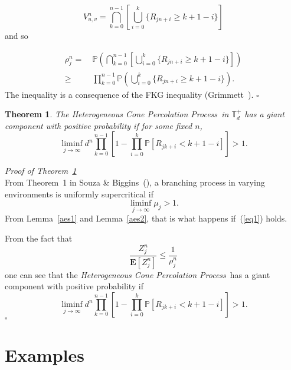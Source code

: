 \documentclass[12pt,reqno,oneside]{amsart}
\theoremstyle{plain}
\newtheorem{teo}{Theorem}[section]
\theoremstyle{definition}
\numberwithin{equation}{section}
\begin{document}
\begin{displaymath}
V^n_{u,v} = \bigcap_{k=0}^{n-1}\displaystyle
\left[\bigcup_{i=0}^{k}\{ R_{jn+i} \geq k+1-i \}\right]
\end{displaymath}
\noindent
and so

\begin{align*}
\rho_{j}^n = & \ {{\mathbb P}}\displaystyle \left (
\bigcap_{k=0}^{n-1}\displaystyle \left[\bigcup_{i=0}^{k}\{
R_{jn+i} \geq k+1-i \}\right] \right) \\ \geq & \ 
\prod_{k=0}^{n-1}{{\mathbb P}}\displaystyle \left(\bigcup_{i=0}^{k}\{
R_{jn+i} \geq k+1-i \}\right).
\end{align*}
The inequality is a consequence of the FKG inequality (Grimmett~\cite[p.34]{Grimmett}). {\hfill $\square$}

\begin{teo} \label{aest}
The {\textit{Heterogeneous Cone Percolation Process}}\ in ${{\mathbb T}}^+_d$ has a giant component with positive pro\-ba\-bi\-li\-ty if
for some fixed $n$,
\begin{equation}
\label{eq1}
\liminf_{j \rightarrow \infty} d^n
\prod_{k=0}^{n-1}[1-\prod_{i=0}^{k}{{\mathbb P}}[R_{jk+i} < k+1-i]] >
1.
\end{equation}
\end{teo}
\noindent \textit{Proof of Theorem~\ref{aest}}\\
From Theorem~1 in Souza \& Biggins~(\cite[p.39]{SouzaBiggins}), a branching process in varying environments
is uniformly supercritical if
\begin{displaymath}
\liminf_{j \rightarrow \infty} \mu_j > 1.
\end{displaymath}
From Lemma~\ref{aes1} and Lemma~\ref{aes2}, that is what happens if~(\ref{eq1}) holds.

From the fact that
\[\frac{Z_j^n}{{{\mathbf E}}[Z_j^n]} \leq
\frac{1}{\rho_{j}^n} \]
\noindent
one can see that the {\textit{Heterogeneous Cone Percolation Process}}\ has a giant component with positive probability if
\begin{displaymath}
\liminf_{j \rightarrow \infty} d^n
\prod_{k=0}^{n-1}[1-\prod_{i=0}^{k}{{\mathbb P}}[R_{jk+i} < k+1-i]] >
1.
\end{displaymath}
{\hfill $\square$}

\section{Examples}
\label{S: Exa}
\end{document}
